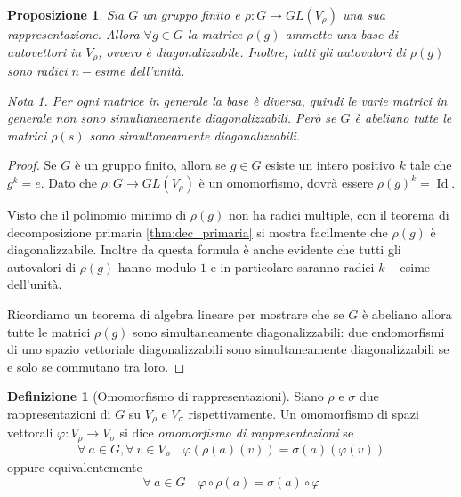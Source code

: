 \documentclass[11pt]{article}
\theoremstyle{plain}
\newtheorem{prop}[thm]{Proposizione}
\theoremstyle{definition}
\newtheorem{defn}{Definizione}[section]
\theoremstyle{remark}
\newtheorem*{note}{Nota}
\DeclareMathOperator{\Id}{Id}
\begin{document}
\begin{prop}
Sia $G$ un gruppo finito e $\rho: G \to GL(V_\rho)$ una sua rappresentazione. Allora $\forall g \in G$ la matrice $\rho(g)$ ammette una base di autovettori in $V_\rho$, ovvero è diagonalizzabile. Inoltre, tutti gli autovalori di $\rho(g)$ sono radici $n-$esime dell'unità.

\begin{note} Per ogni matrice in generale la base è diversa, quindi le varie matrici in generale \emph{non} sono simultaneamente diagonalizzabili.
Però se $G$ è abeliano tutte le matrici $\rho(s)$ sono simultaneamente diagonalizzabili.
\end{note}
\label{prop:diagonalizzabilita rappresentazioni}
\end{prop}

\begin{proof} Se $G$ è un gruppo finito, allora se $g\in G$ esiste un intero positivo $k$ tale che $g^k = e$.
Dato che $\rho:G\to GL(V_\rho)$ è un omomorfismo, dovrà essere $\rho(g)^k = \Id$.

Visto che il polinomio minimo di $\rho(g)$ non ha radici multiple, con il teorema di decomposizione primaria \eqref{thm:dec_primaria} si mostra facilmente che $\rho(g)$ è diagonalizzabile. Inoltre da questa formula è anche evidente che tutti gli autovalori di $\rho(g)$ hanno modulo $1$ e in particolare saranno radici $k-$esime dell'unità.

Ricordiamo un teorema di algebra lineare per mostrare che se $G$ è abeliano allora
tutte le matrici $\rho(g)$ sono simultaneamente diagonalizzabili:
due endomorfismi di uno spazio vettoriale diagonalizzabili sono simultaneamente diagonalizzabili se e solo se commutano tra loro.
\end{proof}




\begin{defn}[Omomorfismo di rappresentazioni]
Siano $\rho$ e $\sigma$ due rappresentazioni di $G$ su $V_{\rho}$ e $V_{\sigma}$ rispettivamente. Un omomorfismo di spazi vettorali $\varphi:V_{\rho}\to V_{\sigma}$ si dice \textit{omomorfismo di rappresentazioni} se
\[
	\forall\ a\in G, \forall\ v\in V_{\rho}\quad \varphi(\rho(a)(v)) = \sigma(a)(\varphi(v))
\]
oppure equivalentemente
\[
	\forall\ a\in G\quad \varphi\circ \rho(a) = \sigma(a)\circ \varphi
\]






\end{defn}
\end{document}
